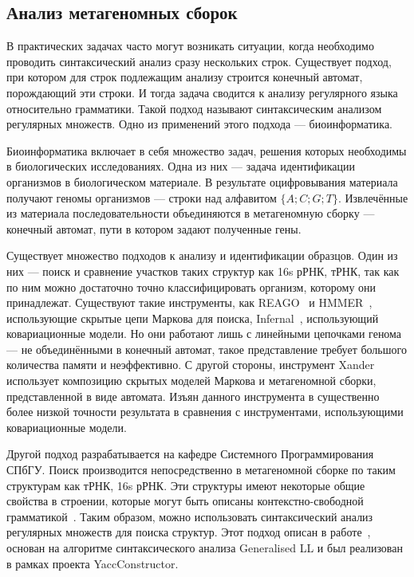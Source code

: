 \documentclass[14pt]{matmex-diploma-custom}
\begin{document}
	\subsection{Анализ метагеномных сборок}
	В практических задачах часто могут возникать ситуации, когда необходимо проводить синтаксический анализ 
    сразу нескольких строк. Существует подход, при котором для строк подлежащим анализу строится 
    конечный автомат, порождающий эти строки. И тогда задача сводится к анализу регулярного языка относительно 
    грамматики. Такой подход называют синтаксическим анализом регулярных множеств. Одно из применений этого подхода ---
    биоинформатика.
    
    Биоинформатика включает в себя множество задач, решения которых необходимы в биологических исследованиях.
    Одна из них --- задача идентификации организмов в биологическом материале. В результате оцифровывания материала получают
    геномы организмов --- строки над алфавитом $\{A;C; G; T\}$.
    Извлечённые из материала последовательности объединяются в метагеномную сборку --- конечный автомат, пути в котором задают полученные 
    гены.
    
    Существует множество подходов к анализу и идентификации образцов. Один из них --- поиск и сравнение участков таких структур как
    16s рРНК, тРНК, так как по ним можно достаточно точно классифицировать организм, которому они принадлежат.
    Существуют такие инструменты, как REAGO~\cite{reago} и HMMER~\cite{hmmer}, использующие скрытые цепи Маркова для поиска, 
    Infernal~\cite{Infernal}, использующий ковариационные модели. Но они работают лишь с линейными цепочками генома ---
    не объединёнными в конечный автомат,
    такое представление требует большого количества памяти и неэффективно. С другой стороны, инструмент Xander~\cite{xander} использует 
    композицию скрытых моделей Маркова и метагеномной сборки, представленной в виде автомата. Изъян данного инструмента в существенно 
    более низкой точности результата в сравнения с инструментами, использующими ковариационные модели.
    
    Другой подход разрабатывается на кафедре Системного Программирования СПбГУ.
    Поиск производится непосредственно в метагеномной сборке по таким структурам как тРНК, 16s рРНК.
    Эти структуры имеют некоторые общие свойства в строении, которые могут быть описаны
    контекстно-свободной грамматикой~\cite{Anderson2013}.
    Таким образом, можно использовать синтаксический анализ регулярных множеств для поиска структур.
	Этот подход описан в работе~\cite{ragozina}, основан на алгоритме синтаксического анализа Generalised LL и 
    был реализован в рамках проекта YaccConstructor.
	
\end{document}

